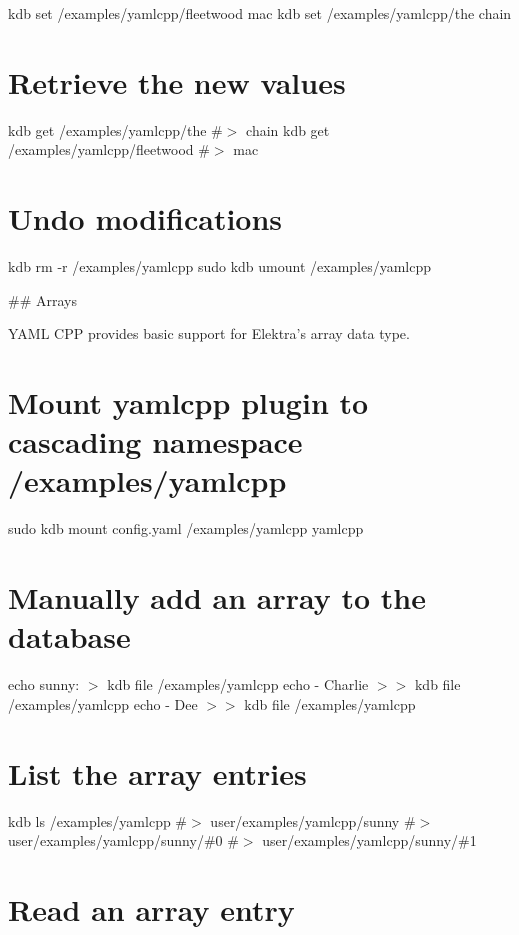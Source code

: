 kdb set /examples/yamlcpp/fleetwood mac kdb set /examples/yamlcpp/the chain

\section*{Retrieve the new values}

kdb get /examples/yamlcpp/the \#$>$ chain kdb get /examples/yamlcpp/fleetwood \#$>$ mac

\section*{Undo modifications}

kdb rm -\/r /examples/yamlcpp sudo kdb umount /examples/yamlcpp 
\begin{DoxyCode}
## Arrays

YAML CPP provides basic support for Elektra’s array data type.
\end{DoxyCode}
 \section*{Mount yamlcpp plugin to cascading namespace {\ttfamily /examples/yamlcpp}}

sudo kdb mount config.\+yaml /examples/yamlcpp yamlcpp

\section*{Manually add an array to the database}

echo \textquotesingle{}sunny\+:\textquotesingle{} $>$ {\ttfamily kdb file /examples/yamlcpp} echo \textquotesingle{} -\/ Charlie\textquotesingle{} $>$$>$ {\ttfamily kdb file /examples/yamlcpp} echo \textquotesingle{} -\/ Dee\textquotesingle{} $>$$>$ {\ttfamily kdb file /examples/yamlcpp}

\section*{List the array entries}

kdb ls /examples/yamlcpp \#$>$ user/examples/yamlcpp/sunny \#$>$ user/examples/yamlcpp/sunny/\#0 \#$>$ user/examples/yamlcpp/sunny/\#1

\section*{Read an array entry}

